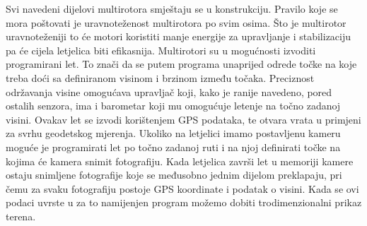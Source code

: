 \documentclass[times, utf8, diplomski]{fer}
\begin{document}
Svi navedeni dijelovi multirotora smještaju se u konstrukciju. Pravilo koje se  mora poštovati je uravnoteženost multirotora po svim osima. Što je multirotor uravnoteženiji to će motori koristiti manje energije za upravljanje i stabilizaciju pa će cijela letjelica biti efikasnija. Multirotori su u mogućnosti izvoditi programirani let. To znači da se putem programa unaprijed odrede točke na koje treba doći sa definiranom visinom i brzinom između točaka. Preciznost održavanja visine omogućava upravljač koji,  kako  je  ranije  navedeno,  pored  ostalih  senzora, ima i  barometar koji mu omogućuje letenje na  točno zadanoj  visini. Ovakav let se izvodi korištenjem GPS podataka, te otvara vrata u primjeni za svrhu geodetskog mjerenja. Ukoliko na letjelici imamo postavljenu kameru moguće je programirati let po točno zadanoj ruti i na njoj definirati točke na kojima će kamera snimit fotografiju. Kada letjelica završi let u memoriji kamere ostaju snimljene fotografije koje se međusobno jednim dijelom preklapaju, pri čemu za svaku fotografiju postoje GPS koordinate i podatak o visini. Kada se ovi podaci uvrste u za to namijenjen program možemo dobiti trodimenzionalni prikaz terena. \citep{Zilic}
\end{document}
